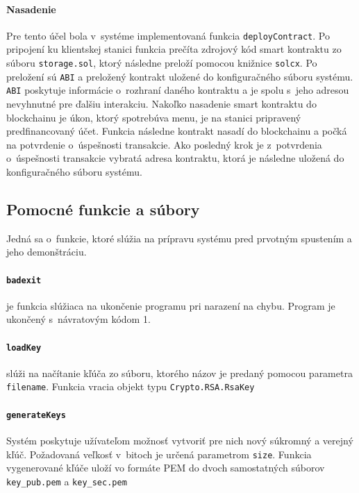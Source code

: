 \paragraph{Nasadenie}
Pre tento účel bola v~systéme implementovaná funkcia \texttt{deployContract}. Po pripojení ku klientskej stanici funkcia prečíta zdrojový kód smart kontraktu zo súboru \texttt{storage.sol}, ktorý následne preloží pomocou knižnice \texttt{solcx}. Po preložení sú \texttt{ABI} a preložený kontrakt uložené do konfiguračného súboru systému. \texttt{ABI} poskytuje informácie o~rozhraní daného kontraktu a je spolu s~jeho adresou nevyhnutné pre ďalšiu interakciu. Nakoľko nasadenie smart kontraktu do blockchainu je úkon, ktorý spotrebúva menu, je na stanici pripravený predfinancovaný účet. Funkcia následne kontrakt nasadí do blockchainu a počká na potvrdenie o~úspešnosti transakcie. Ako posledný krok je z~potvrdenia o~úspešnosti transakcie vybratá adresa kontraktu, ktorá je následne uložená do konfiguračného súboru systému.

\subsection{Pomocné funkcie a súbory}
Jedná sa o~funkcie, ktoré slúžia na prípravu systému pred prvotným spustením a jeho demonštráciu.

\paragraph{\texttt{badexit}} je funkcia slúžiaca na ukončenie programu pri narazení na chybu. Program je ukončený s~návratovým kódom 1.

\paragraph{\texttt{loadKey}} slúži na načítanie kľúča zo súboru, ktorého názov je predaný pomocou parametra \texttt{filename}. Funkcia vracia objekt typu \texttt{Crypto.RSA.RsaKey}

\paragraph{\texttt{generateKeys}}  Systém poskytuje užívateľom možnosť vytvoriť pre nich nový súkromný a verejný kľúč. Požadovaná veľkosť v~bitoch je určená parametrom \texttt{size}. Funkcia vygenerované kľúče uloží vo formáte PEM do dvoch samostatných súborov \texttt{key\_pub.pem} a \texttt{key\_sec.pem}


